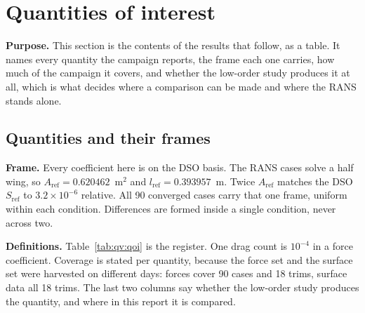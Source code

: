 \section{Quantities of interest}
\label{sec:qoi}

\textbf{Purpose.} This section is the contents of the results that follow, as a table. It names
every quantity the campaign reports, the frame each one carries, how much of the campaign it
covers, and whether the low-order study produces it at all, which is what decides where a
comparison can be made and where the RANS stands alone.
\subsection{Quantities and their frames}
\label{sec:qv:qoi}
\label{sec:cond:frame}
\textbf{Frame.} Every coefficient here is on the DSO basis. The RANS cases solve a half wing, so
$A_\mathrm{ref} = \num{0.620462}$~m$^2$ and $l_\mathrm{ref} = \num{0.393957}$~m. Twice
$A_\mathrm{ref}$ matches the DSO $S_\mathrm{ref}$ to $3.2\times10^{-6}$ relative. All 90 converged
cases carry that one frame, uniform within each condition. Differences are formed inside a single
condition, never across two.

\textbf{Definitions.} Table~\ref{tab:qv:qoi} is the register. One drag count is $10^{-4}$ in a
force coefficient. Coverage is stated per quantity, because the force set and the surface set
were harvested on different days: forces cover 90 cases and 18 trims, surface data all 18 trims.
The last two columns say whether the low-order study produces the quantity, and where in this
report it is compared.


